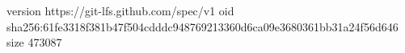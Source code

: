 version https://git-lfs.github.com/spec/v1
oid sha256:61fe3318f381b47f504cdddc948769213360d6ca09e3680361bb31a24f56d646
size 473087
